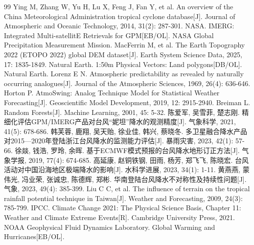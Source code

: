 \documentclass[UTF8,a4paper,zihao=5,fontset=fandol]{ctexart}
\numberwithin{equation}{section}
\numberwithin{figure}{section}
\numberwithin{table}{section}
\begin{document}
{}
\begin{thebibliography}{99}
   Ying M, Zhang W, Yu H, Lu X, Feng J, Fan Y, et al. An overview of the China Meteorological Administration tropical cyclone database[J]. Journal of Atmospheric and Oceanic Technology, 2014, 31(2): 287-301.
   NASA. IMERG: Integrated Multi-satellitE Retrievals for GPM[EB/OL]. NASA Global Precipitation Measurement Mission.
   MacFerrin M, et al. The Earth Topography 2022 (ETOPO 2022) global DEM dataset[J]. Earth System Science Data, 2025, 17: 1835-1849.
   Natural Earth. 1:50m Physical Vectors: Land polygons[DB/OL]. Natural Earth.
   Lorenz E N. Atmospheric predictability as revealed by naturally occurring analogues[J]. Journal of the Atmospheric Sciences, 1969, 26(4): 636-646.
   Horton P. AtmoSwing: Analog Technique Model for Statistical Weather Forecasting[J]. Geoscientific Model Development, 2019, 12: 2915-2940.
   Breiman L. Random Forests[J]. Machine Learning, 2001, 45: 5-32.
   陈爱军, 吴雪菲, 楚志刚. 精细化评估GPM/IMERG产品对台风“妮坦”降水的观测精度[J]. 气象科学, 2021, 41(5): 678-686.
   韩芙蓉, 鹿翔, 吴天贻, 徐业佳, 韩兴, 蔡晓冬. 多卫星融合降水产品对2015—2020年登陆浙江台风降水的监测能力评估[J]. 暴雨灾害, 2023, 42(1): 57-66.
   徐{\songtifallback 燚}, 钱浩, 罗玲, 余晖. 基于ECMWF模式预报的台风降水地形订正方法[J]. 气象学报, 2019, 77(4): 674-685.
   高延康, 赵铜铁钢, 田雨, 杨芳, 郑飞飞, 陈晓宏. 台风活动对中国沿海地区极端降水的影响[J]. 水科学进展, 2023, 34(1): 1-11.
   黄燕燕, 蒙伟光, 冯业荣, 张诚忠, 陈德辉, 郑彬. 华南登陆台风降水不对称性及持续性问题[J]. 气象, 2023, 49(4): 385-399.
   Liu C C, et al. The influence of terrain on the tropical rainfall potential technique in Taiwan[J]. Weather and Forecasting, 2009, 24(3): 785-799.
   IPCC. Climate Change 2021: The Physical Science Basis, Chapter 11: Weather and Climate Extreme Events[R]. Cambridge University Press, 2021.
   NOAA Geophysical Fluid Dynamics Laboratory. Global Warming and Hurricanes[EB/OL].
\end{thebibliography}

\appendix
\end{document}

